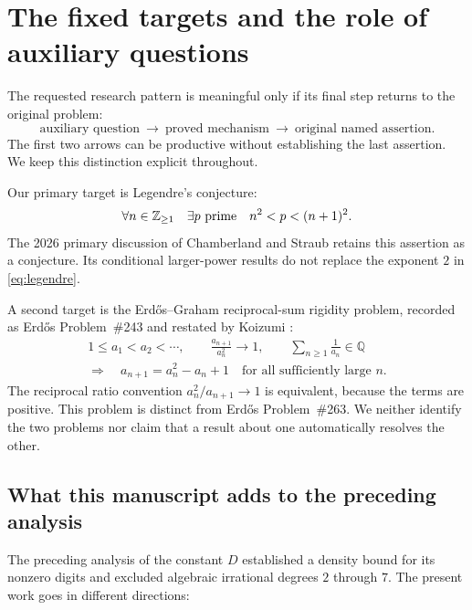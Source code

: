 \documentclass[11pt,a4paper]{article}
\theoremstyle{definition}
\theoremstyle{remark}\newtheorem{remark}[theorem]{Remark}
\newcommand{\Q}{\mathbb Q}\newcommand{\C}{\mathbb C}
\begin{document}
\section{The fixed targets and the role of auxiliary questions}
\label{sec:targets}

The requested research pattern is meaningful only if its final step
returns to the original problem:
\[
\text{auxiliary question}\ \longrightarrow\ \text{proved mechanism}
\ \longrightarrow\ \text{original named assertion}.
\]
The first two arrows can be productive without establishing the last
assertion. We keep this distinction explicit throughout.

Our primary target is Legendre's conjecture:
\begin{equation}\label{eq:legendre}
 \forall n\in\mathbb Z_{\ge1}\quad\exists p\text{ prime}\quad
 n^2<p<(n+1)^2.
\end{equation}
The 2026 primary discussion of Chamberland and Straub
\cite{CS} retains this assertion as a conjecture. Its conditional
larger-power results do not replace the exponent $2$ in
\eqref{eq:legendre}.

A second target is the Erd\H{o}s--Graham reciprocal-sum rigidity problem,
recorded as Erd\H{o}s Problem~\#243 and restated by Koizumi
\cite[Question 1]{Koizumi}:
\begin{equation}\label{eq:erdos243}
 \begin{gathered}
 1\le a_1<a_2<\cdots,\qquad
 \frac{a_{n+1}}{a_n^2}\longrightarrow1,
 \qquad \sum_{n\ge1}\frac1{a_n}\in\Q
 \\
 \Longrightarrow\quad
 a_{n+1}=a_n^2-a_n+1\quad\text{for all sufficiently large }n.
 \end{gathered}
\end{equation}
The reciprocal ratio convention $a_n^2/a_{n+1}\to1$ is equivalent,
because the terms are positive. This problem is distinct from
Erd\H{o}s Problem~\#263. We neither identify the two problems nor
claim that a result about one automatically resolves the other.

\subsection{What this manuscript adds to the preceding analysis}

The preceding analysis of the constant $D$ established a density bound
for its nonzero digits and excluded algebraic irrational degrees
$2$ through $7$. The present work goes in different directions:
\end{document}
